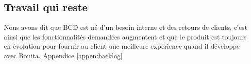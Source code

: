 \subsection{Travail qui reste}
Nous avons dit que BCD est né d'un besoin interne et des retours de clients, c'est ainsi que les fonctionnalités demandées augmentent et que le produit est toujours en évolution pour fournir au client une meilleure expérience quand il développe avec Bonita. Appendice \ref{appen:backlog}
